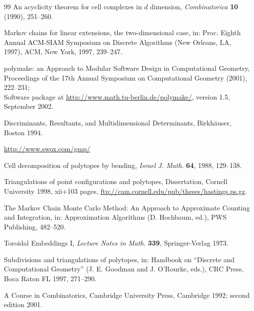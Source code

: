 \begin{thebibliography}{99}
{An acyclicity theorem for cell complexes in $d$ dimension,}
{{\sl Combinatorica} {\bf 10} (1990), 251--260.}

{Markov chains for linear extensions, the two-dimensional case,}
{in: Proc. Eighth Annual ACM-SIAM Symposium on Discrete Algorithms 
(New Orleans, LA, 1997), ACM, New York, 1997, 239--247.}

{polymake: an Approach to Modular Software Design in Computational Geometry,}
{Proceedings of the 17th Annual Symposium on Computational Geometry
(2001),
222--231;\\
Software package at \url{http://www.math.tu-berlin.de/polymake/},
version 1.5, September 2002.}

{Discriminants, Resultants, and Multidimensional Determinants,}
{Birkh\"auser, Boston 1994.}

\url{http://www.swox.com/gmp/}

{Cell decomposition of polytopes by bending,}
{{\sl Israel J. Math.} {\bf 64}, 1988, 129--138.}

{Triangulations of point configurations and polytopes,}
{Dissertation, Cornell University 1998, xii+103 pages,
\url{ftp://cam.cornell.edu/pub/theses/hastings.ps.gz}.}

{The {M}arkov Chain {M}onte {C}arlo Method: An Approach to Approximate Counting and Integration},
{in: Approximation Algorithms (D. Hochbaum, ed.), PWS Publishing, 482--520.}

{Toroidal Embeddings I,}
{{\sl Lecture Notes in Math.} {\bf 339}, Springer-Verlag 1973.}

{Subdivisions and triangulations of polytopes,}
{in: Handbook on ``Discrete and Computational Geometry''
(J. E. Goodman and J. O'Rourke, eds.),
CRC Press, Boca Raton FL 1997, 271--290.}

{A Course in Combinatorics,}
{Cambridge University Press, Cambridge 1992; second edition 2001.}


\end{thebibliography}
